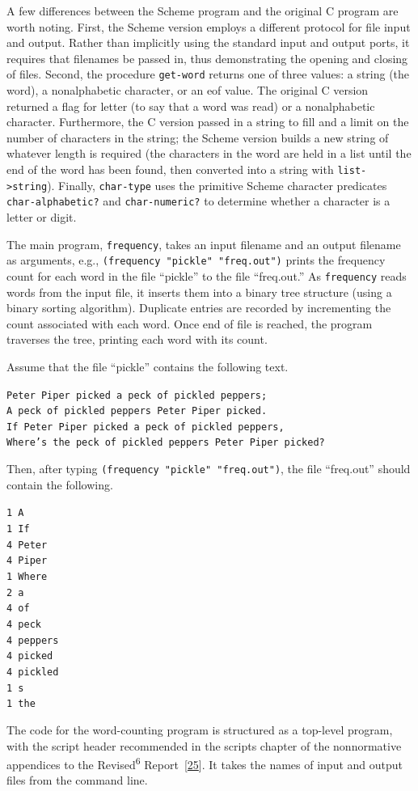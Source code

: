A few differences between the Scheme program and the original C
program are worth noting.
First, the Scheme version employs a different protocol for file
input and output.
Rather than implicitly using the standard input and output ports, it
requires that filenames be passed in, thus demonstrating the opening
and closing of files.
Second, the procedure \texttt{get-word} returns one of three values:
a string (the word), a nonalphabetic character, or an eof value.
The original C version returned a flag for letter (to say that a
word was read) or a nonalphabetic character.
Furthermore, the C version passed in a string to fill and a limit
on the number of characters in the string; the Scheme version builds
a new string of whatever length is required (the characters in the
word are held in a list until the end of the word has been found,
then converted into a string with \texttt{list-\textgreater{}string}).
Finally, \texttt{char-type} uses the primitive Scheme character predicates
\texttt{char-alphabetic?} and \texttt{char-numeric?} to determine whether a
character is a letter or digit.


The main program, \label{examples_s24}\texttt{frequency},
takes an input filename and an
output filename as arguments, e.g., \texttt{(frequency "pickle" "freq.out")}
prints the frequency count for each word in the file ``pickle'' to
the file ``freq.out.''
As \texttt{frequency} reads words from the input file, it inserts them
into a binary tree structure (using a binary sorting algorithm).
Duplicate entries are recorded by incrementing the count associated
with each word.
Once end of file is reached, the program traverses the tree, printing
each word with its count.


Assume that the file ``pickle'' contains the following text.


\begin{alltt}
Peter Piper picked a peck of pickled peppers;
A peck of pickled peppers Peter Piper picked.
If Peter Piper picked a peck of pickled peppers,
Where's the peck of pickled peppers Peter Piper picked?
\end{alltt}


Then, after typing \texttt{(frequency "pickle" "freq.out")}, the file
``freq.out'' should contain the following.


\begin{alltt}
1 A
1 If
4 Peter
4 Piper
1 Where
2 a
4 of
4 peck
4 peppers
4 picked
4 pickled
1 s
1 the
\end{alltt}


The code for the word-counting program is structured as a top-level
program, with the script header recommended in the scripts chapter
of the nonnormative appendices to the Revised\textsuperscript{6} Report [\hyperref[bibliography_g243]{25}].
It takes the names of input and output files from the command line.


